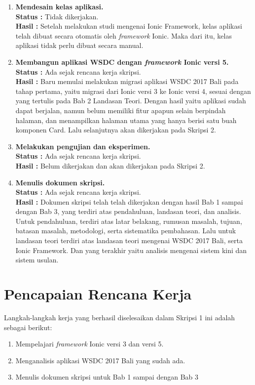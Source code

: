 \documentclass[a4paper,twoside]{article}
\begin{document}
\begin{enumerate}
		\item \textbf{Mendesain kelas aplikasi.}\\
		{\bf Status :} Tidak dikerjakan.\\
		{\bf Hasil :} Setelah melakukan studi mengenai Ionic Framework, kelas aplikasi telah dibuat secara otomatis oleh \textit{framework} Ionic. Maka dari itu, kelas aplikasi tidak perlu dibuat secara manual.
		
		\item \textbf{Membangun aplikasi WSDC dengan \textit{framework} Ionic versi 5.}\\
		{\bf Status :} Ada sejak rencana kerja skripsi.\\
		{\bf Hasil :} Baru memulai melakukan migrasi aplikasi WSDC 2017 Bali pada tahap pertama, yaitu migrasi dari Ionic versi 3 ke Ionic versi 4, sesuai dengan yang tertulis pada Bab 2 Landasan Teori. Dengan hasil yaitu aplikasi sudah dapat berjalan, namun belum memiliki fitur apapun selain berpindah halaman, dan menampilkan halaman utama yang hanya berisi satu buah komponen Card. Lalu selanjutnya akan dikerjakan pada Skripsi 2.
		
		\item \textbf{Melakukan pengujian dan eksperimen.}\\
		{\bf Status :} Ada sejak rencana kerja skripsi.\\
		{\bf Hasil :} Belum dikerjakan dan akan dikerjakan pada Skripsi 2.
		
		\item \textbf{Menulis dokumen skripsi.}\\
		{\bf Status :} Ada sejak rencana kerja skripsi.\\
		{\bf Hasil :} Dokumen skripsi telah telah dikerjakan dengan hasil Bab 1 sampai dengan Bab 3, yang terdiri atas pendahuluan, landasan teori, dan analisis. Untuk pendahuluan, terdiri atas latar belakang, rumusan masalah, tujuan, batasan masalah, metodologi, serta sistematika pembahasan. Lalu untuk landasan teori terdiri atas landasan teori mengenai WSDC 2017 Bali, serta Ionic Framework. Dan yang terakhir yaitu analisis mengenai sistem kini dan sistem usulan.

	\end{enumerate}

\section{Pencapaian Rencana Kerja}
Langkah-langkah kerja yang berhasil diselesaikan dalam Skripsi 1 ini adalah sebagai berikut:
\begin{enumerate}
\item Mempelajari \textit{framework} Ionic versi 3 dan versi 5.
\item Menganalisis aplikasi WSDC 2017 Bali yang sudah ada.
\item Menulis dokumen skripsi untuk Bab 1 sampai dengan Bab 3
\end{enumerate}
\end{document}
